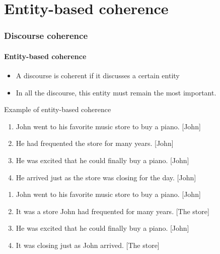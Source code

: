 \documentclass[xcolor=table]{beamer}
\begin{document}
\section{Entity-based coherence}

\begin{frame}
	\frametitle{Discourse coherence}
	\framesubtitle{Entity-based coherence}
	
	\begin{itemize}
		\item A discourse is coherent if it discusses a certain entity
		\item In all the discourse, this entity must remain the most important.
	\end{itemize}

	\begin{exampleblock}{Example of entity-based coherence \cite{2019-jurafsky-martin}}
		\small
		\begin{minipage}{.48\textwidth}
			\begin{enumerate}
				\item John went to his favorite music store to buy a piano. [John]
				\item He had frequented the store for many years. [John]
				\item He was excited that he could finally buy a piano. [John]
				\item He arrived just as the store was closing for the day. [John]
			\end{enumerate}
		\end{minipage}
		\begin{minipage}{.48\textwidth}
			\begin{enumerate}
				\item John went to his favorite music store to buy a piano. [John]
				\item It was a store John had frequented for many years. [The store]
				\item He was excited that he could finally buy a piano. [John]
				\item It was closing just as John arrived. [The store]
			\end{enumerate}
		\end{minipage}
	\end{exampleblock}
	
\end{frame}
\end{document}
